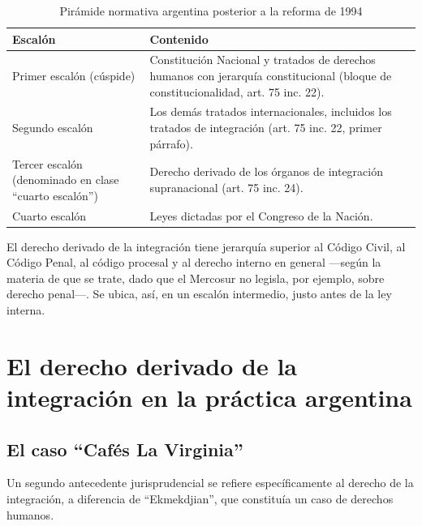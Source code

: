 \documentclass[12pt,oneside]{book}
\begin{document}
\begin{table}[H]
\centering
\caption{Pirámide normativa argentina posterior a la reforma de 1994}
\begin{tabularx}{\textwidth}{@{}>{\raggedright\arraybackslash}p{}X@{}}
\toprule
\textbf{Escalón} & \textbf{Contenido} \\
\midrule
Primer escalón (cúspide) & Constitución Nacional y tratados de derechos humanos con jerarquía constitucional (bloque de constitucionalidad, art. 75 inc. 22). \\
\addlinespace
Segundo escalón & Los demás tratados internacionales, incluidos los tratados de integración (art. 75 inc. 22, primer párrafo). \\
\addlinespace
Tercer escalón (denominado en clase ``cuarto escalón'') & Derecho derivado de los órganos de integración supranacional (art. 75 inc. 24). \\
\addlinespace
Cuarto escalón & Leyes dictadas por el Congreso de la Nación. \\
\bottomrule
\end{tabularx}
\end{table}


El derecho derivado de la integración tiene jerarquía superior al Código Civil, al Código Penal, al código procesal y al derecho interno en general —según la materia de que se trate, dado que el Mercosur no legisla, por ejemplo, sobre derecho penal—. Se ubica, así, en un escalón intermedio, justo antes de la ley interna.

\section{El derecho derivado de la integración en la práctica argentina}

\subsection{El caso ``Cafés La Virginia''}

Un segundo antecedente jurisprudencial se refiere específicamente al derecho de la integración, a diferencia de ``Ekmekdjian'', que constituía un caso de derechos humanos.
\end{document}
